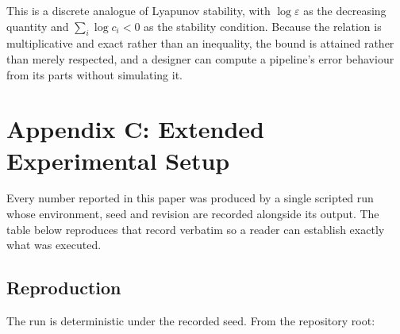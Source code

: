 \documentclass[10pt,twocolumn,letterpaper]{article}
\begin{document}
This is a discrete analogue of Lyapunov stability, with $\log \varepsilon$ as the decreasing quantity and $\sum_i \log c_i < 0$ as the stability condition. Because the relation is multiplicative and exact rather than an inequality, the bound is attained rather than merely respected, and a designer can compute a pipeline's error behaviour from its parts without simulating it.




\section{Appendix C: Extended Experimental Setup}


Every number reported in this paper was produced by a single scripted run whose environment, seed and revision are recorded alongside its output. The table below reproduces that record verbatim so a reader can establish exactly what was executed.
\begin{table}[htbp]
\centering
{}
\end{table}


\subsection{Reproduction}


The run is deterministic under the recorded seed. From the repository root:
\end{document}
